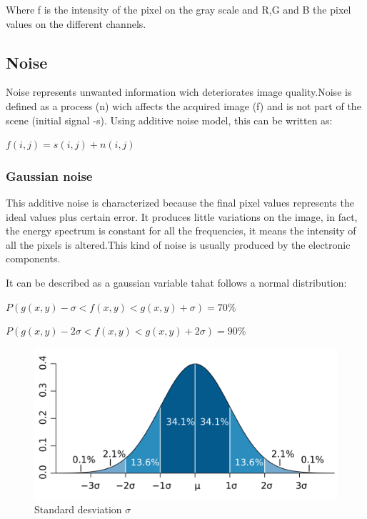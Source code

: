 \documentclass[a4paper]{article}
\begin{document}
Where f is the intensity of the pixel on the gray scale and R,G and B the pixel values on the different channels.

\subsection{Noise}

Noise represents unwanted information wich deteriorates image quality.Noise is defined as a process (n) wich affects the acquired image (f) and is not part of the scene (initial signal -s). Using additive noise model, this can be written as:
\begin{center}
\begin{math}
f(i,j)=s(i,j) +n(i,j)
\end{math}
\end{center}

\subsubsection{Gaussian noise}

This additive noise is characterized because the final pixel values represents the ideal values plus certain error. It produces little variations on the image, in fact, the energy spectrum is constant for all the frequencies, it means the intensity of all the pixels is altered.This kind of noise is usually produced by the electronic components.

It can  be described as a gaussian variable tahat follows a normal distribution:\\

\begin{center}
\begin{math}
P(g(x,y)-\sigma < f(x,y) <g(x,y)+\sigma)=70\%
\end{math}
\end{center}

\begin{center}
\begin{math}
P(g(x,y)-2\sigma < f(x,y) <g(x,y)+2\sigma)=90\%
\end{math}
\end{center}



\begin{figure}
\includegraphics[scale=0.15]{./.Multimedia/Standard_deviation_diagram.png}

\caption{Standard desviation $\sigma$}
\end{figure}
\end{document}
